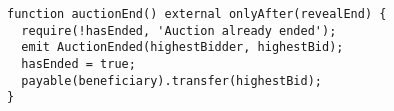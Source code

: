 \begin{lstlisting}[language=Solidity]
function auctionEnd() external onlyAfter(revealEnd) {
  require(!hasEnded, 'Auction already ended');
  emit AuctionEnded(highestBidder, highestBid);
  hasEnded = true;
  payable(beneficiary).transfer(highestBid);
}
\end{lstlisting}